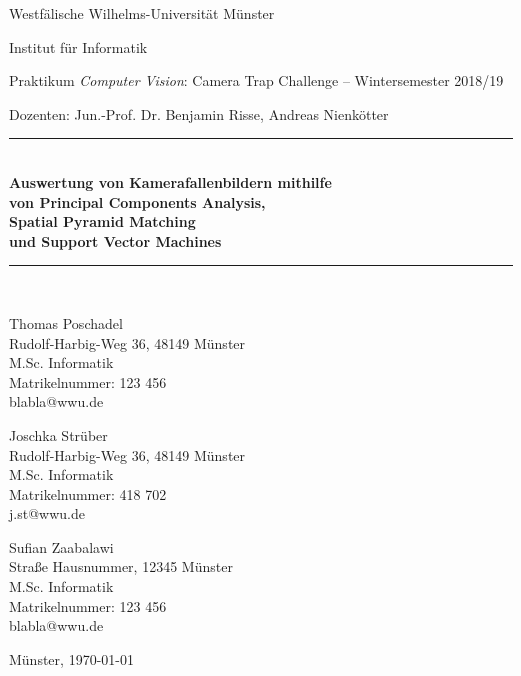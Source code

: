 \begin{titlepage}
	\newcommand{\HRule}{\rule{\linewidth}{0.8mm}}
	
	Westfälische Wilhelms-Universität Münster
	
	Institut für Informatik
	
	Praktikum \textit{Computer Vision}: Camera Trap Challenge -- Wintersemester 2018/19 
	
	Dozenten: Jun.-Prof. Dr. Benjamin Risse, Andreas Nienkötter

	\center
 
 	
	
	\HRule \\[0.5cm]
	{ \huge \sffamily\bfseries Auswertung von Kamerafallenbildern mithilfe \\ von Principal Components Analysis, \\ Spatial Pyramid Matching \\ und Support Vector Machines}\\[0.4cm]
	\HRule \\[0.5cm]
	
	
	\vfill
	\flushright
	
	Thomas Poschadel \\
	Rudolf-Harbig-Weg 36, 48149 Münster \\
	M.Sc. Informatik \\
	Matrikelnummer: 123 456 \\
	blabla@wwu.de \\
	
	\vspace{2em}
	
	Joschka Strüber \\
	Rudolf-Harbig-Weg 36, 48149 Münster \\
	M.Sc. Informatik \\
	Matrikelnummer: 418 702 \\
	j.st@wwu.de \\
	
	\vspace{2em}
	
	Sufian Zaabalawi \\
	Straße Hausnummer, 12345 Münster \\
	M.Sc. Informatik \\
	Matrikelnummer: 123 456 \\
	blabla@wwu.de \\
	
	\vspace{2em}
	
	Münster, \today
	
	\restoregeometry
\end{titlepage}